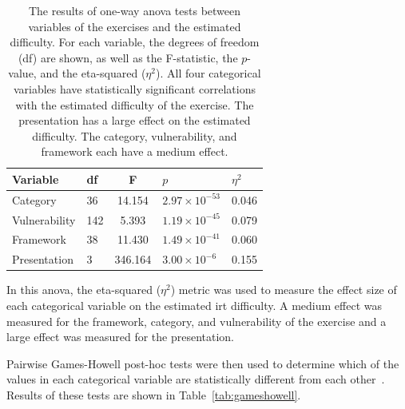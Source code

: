 \begin{table}
    \centering
    \caption[\Gls{anova} test results for Rasch model]{The results of one-way \gls{anova} tests between variables of the exercises and the estimated difficulty. For each variable, the degrees of freedom (df) are shown, as well as the F-statistic, the $p$-value, and the eta-squared ($\eta^2$). All four categorical variables have statistically significant correlations with the estimated difficulty of the exercise. The presentation has a large effect on the estimated difficulty. The category, vulnerability, and framework each have a medium effect.}
    \setcellgapes{4pt}\makegapedcells
    \begin{tabular}{l l S[table-format=3.3] l l}
Variable & df & F & $p$ & $\eta^2$ \\
    \hline
    Category & 36 & 14.154 & $2.97 \times 10^{-53}$ & 0.046 \\
    Vulnerability & 142 & 5.393 & $1.19 \times 10^{-45}$ & 0.079 \\
    Framework & 38 & 11.430 & $ 1.49 \times 10^{-41}$ & 0.060 \\
    Presentation & 3 & 346.164 & $3.00 \times 10^{-6}$ & 0.155 \\
    \end{tabular}
    \label{tab:anova1}
\end{table}

In this \gls{anova}, the eta-squared ($\eta^2$) metric was used to measure the effect size of each categorical variable on the estimated \gls{irt} difficulty.
A medium effect was measured for the framework, category, and vulnerability of the exercise and a large effect was measured for the presentation.

Pairwise Games-Howell post-hoc tests were then used to determine which of the values in each categorical variable are statistically different from each other~\cite{games1976pairwise}.
Results of these tests are shown in Table~\ref{tab:gameshowell}.

